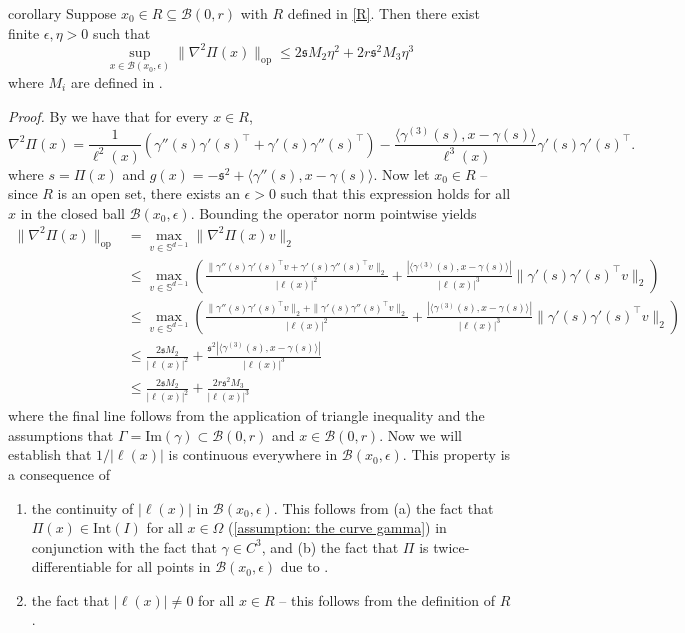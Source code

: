 \documentclass[11pt]{article}
\begin{document}
\begin{appendices}
\begin{restatable}{corollary}{} \label{lemma: operator norm bound}
    Suppose $x_0 \in R \subseteq \mathcal{B}(0, r)$ with $R$ defined in \cref{R}. Then there exist finite $\epsilon, \eta > 0$ such that 
    \[ \sup_{x\in \mathcal{B}(x_0,\epsilon)}\|\nabla^2\Pi(x)\|_{\operatorname{op}} \leq 2\mathfrak sM_2\eta^{2}+2r\mathfrak s^2M_3\eta^{3}\]
    where $M_i$ are defined in .
\end{restatable}

\noindent \textit{Proof.} By  we have that for every $x \in R$, 
\[\nabla^2\Pi(x) = \frac{1}{\ell^2(x)}\left(\gamma''(s)\gamma'(s)^{\top} + \gamma'(s)\gamma''(s)^{\top}\right)- \frac{\langle\gamma^{(3)}(s), x - \gamma(s)\rangle}{\ell^3(x)}\gamma'(s)\gamma'(s)^{\top}.\]
where $s = \Pi(x)$ and $g(x) = -\mathfrak s^2 + \langle\gamma''(s), x-\gamma(s)\rangle$. Now let $x_0 \in R$ -- since $R$ is an open set, there exists an $\epsilon > 0$ such that this expression holds for all $x$ in the closed ball $\mathcal{B}(x_0, \epsilon)$. Bounding the operator norm pointwise yields
\begin{align*}
    \|\nabla^2\Pi(x)\|_{\operatorname{op}} &= \max_{v\in \mathbb{S}^{d-1}} \|\nabla^2\Pi(x)v\|_2 \\
    &\leq \max_{v\in \mathbb{S}^{d-1}}\left(\frac{\|\gamma''(s)\gamma'(s)^{\top}v + \gamma'(s)\gamma''(s)^{\top}v\|_2}{|\ell(x)|^2} + \frac{|\langle\gamma^{(3)}(s), x - \gamma(s)\rangle|}{|\ell(x)|^3} \|\gamma'(s)\gamma'(s)^{\top}v\|_2\right) \\
    &\leq \max_{v\in \mathbb{S}^{d-1}}\left(\frac{\|\gamma''(s)\gamma'(s)^{\top}v\|_2 + \|\gamma'(s)\gamma''(s)^{\top}v\|_2}{|\ell(x)|^2} + \frac{|\langle\gamma^{(3)}(s), x - \gamma(s)\rangle|}{|\ell(x)|^3} \|\gamma'(s)\gamma'(s)^{\top}v\|_2\right) \\
    &\leq \frac{2\mathfrak sM_2}{|\ell(x)|^2} + \frac{\mathfrak s^2|\langle\gamma^{(3)}(s), x - \gamma(s)\rangle|}{|\ell(x)|^3} \\
    &\leq \frac{2\mathfrak sM_2}{|\ell(x)|^2} + \frac{2r\mathfrak s^2 M_3}{|\ell(x)|^3}
\end{align*}
where the final line follows from the application of triangle inequality and the assumptions that $\Gamma = \text{Im}(\gamma) \subset \mathcal{B}(0, r)$ and $x \in  \mathcal{B}(0, r)$. Now we will establish that $1/|\ell(x)|$ is continuous everywhere in $\mathcal{B}(x_0,\epsilon)$. This property is a consequence of 
\begin{enumerate}
    \item the continuity of $|\ell(x)|$ in $\mathcal{B}(x_0, \epsilon)$. This follows from (a) the fact that $\Pi(x) \in \text{Int}(I)$ for all $x \in \Omega$ (\cref{assumption: the curve gamma}) in conjunction with the fact that $\gamma \in C^3$, and (b) the fact that $\Pi$ is twice-differentiable for all points in $\mathcal{B}(x_0, \epsilon)$ due to .
    \item the fact that $|\ell(x)| \neq 0$ for all $x \in R$ -- this follows from the definition of $R$.
\end{enumerate}


\end{appendices}
\end{document}

